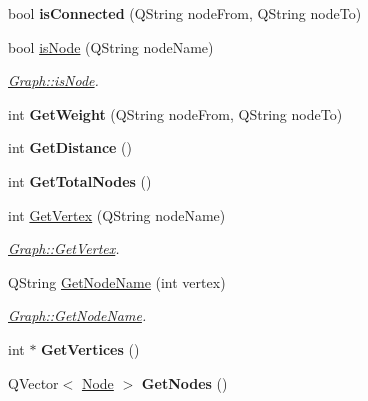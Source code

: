 \begin{DoxyCompactItemize}
\mbox{\label{class_graph_a9f99e0a20840bf8290195981904c9a5d}} 
bool {\bfseries is\+Connected} (Q\+String node\+From, Q\+String node\+To)
\item 
bool \mbox{\hyperlink{class_graph_a981460a9962c0cccada8459347a5fd5d}{is\+Node}} (Q\+String node\+Name)
\begin{DoxyCompactList}\small\item\em \mbox{\hyperlink{class_graph_a981460a9962c0cccada8459347a5fd5d}{Graph\+::is\+Node}}. \end{DoxyCompactList}\item 
\mbox{\label{class_graph_a2f023d74e3da24e821a2dd1ffa410bb0}} 
int {\bfseries Get\+Weight} (Q\+String node\+From, Q\+String node\+To)
\item 
\mbox{\label{class_graph_a1848b068d8da7c3b1507bb5aa2630bc8}} 
int {\bfseries Get\+Distance} ()
\item 
\mbox{\label{class_graph_ae7f6e89dbf220a7d08067e691b46f37e}} 
int {\bfseries Get\+Total\+Nodes} ()
\item 
int \mbox{\hyperlink{class_graph_a7f7b9f3d4992166ce4b52a1ea7d9c816}{Get\+Vertex}} (Q\+String node\+Name)
\begin{DoxyCompactList}\small\item\em \mbox{\hyperlink{class_graph_a7f7b9f3d4992166ce4b52a1ea7d9c816}{Graph\+::\+Get\+Vertex}}. \end{DoxyCompactList}\item 
Q\+String \mbox{\hyperlink{class_graph_a3102766a44bdc521d67dc1ac57c948b4}{Get\+Node\+Name}} (int vertex)
\begin{DoxyCompactList}\small\item\em \mbox{\hyperlink{class_graph_a3102766a44bdc521d67dc1ac57c948b4}{Graph\+::\+Get\+Node\+Name}}. \end{DoxyCompactList}\item 
\mbox{\label{class_graph_a4882a1652e182b65d8bc67585cbb1631}} 
int $\ast$ {\bfseries Get\+Vertices} ()
\item 
\mbox{\label{class_graph_a99767655bcaea44c18b136363c521dfc}} 
Q\+Vector$<$ \mbox{\hyperlink{struct_node}{Node}} $>$ {\bfseries Get\+Nodes} ()
\item 

\end{DoxyCompactItemize}
